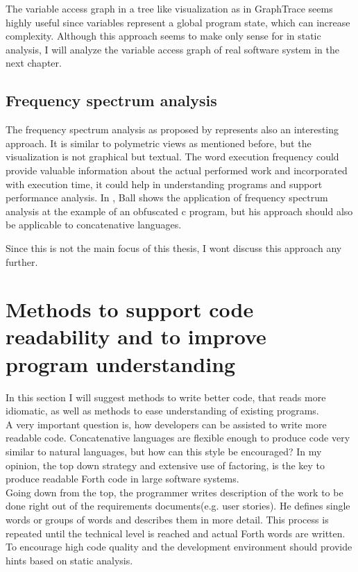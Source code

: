 The variable access graph in a tree like visualization as in GraphTrace seems highly useful since variables represent a global program state, which can increase complexity. Although this approach seems to make only sense for in static analysis, I will analyze the variable access graph of real software system in the next chapter.

\subsection*{Frequency spectrum analysis}

The frequency spectrum analysis as proposed by \cite{Ball:1999:CDA:318774.318944} represents also an interesting approach. It is similar to polymetric views as mentioned before, but the visualization is not graphical but textual. The word execution frequency could provide valuable information about the actual performed work and incorporated with execution time, it could help in understanding programs and support performance analysis. In \cite{Ball:1999:CDA:318774.318944}, Ball shows the application of frequency spectrum analysis at the example of an obfuscated c program, but his approach should also be applicable to concatenative languages.

Since this is not the main focus of this thesis, I wont discuss this approach any further.

\section{Methods to support code readability and to improve program understanding}

In this section I will suggest methods to write better code, that reads more idiomatic, as well as methods to ease understanding of existing programs.
\\
A very important question is, how developers can be assisted to write more readable code. Concatenative languages are flexible enough to produce code very similar to natural languages, but how can this style be encouraged? In my opinion, the top down strategy and extensive use of factoring, is the key to produce readable Forth code in large software systems.
\\
Going down from the top, the programmer writes description of the work to be done right out of the requirements documents(e.g. user stories). He defines single words or groups of words and describes them in more detail. This process is repeated until the technical level is reached and actual Forth words are written.
\\
To encourage high code quality and the development environment should provide hints based on static analysis.

